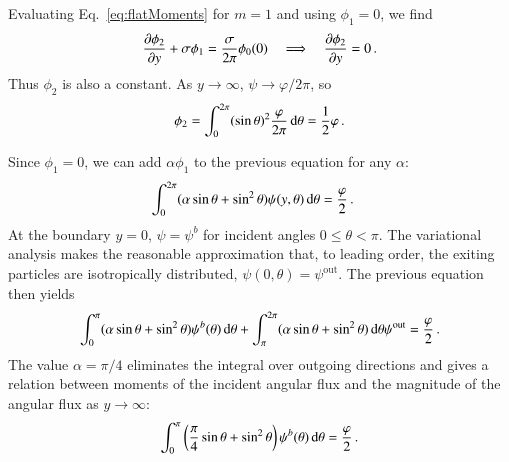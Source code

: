 \documentclass{anstrans}
\begin{document}
Evaluating Eq.~\eqref{eq:flatMoments} for $m=1$ and using
$\phi_{1}=0$, we find
\begin{equation*}
  \frac{\partial \phi_{2}}{\partial y}
  + \sigma \phi_{1}
  = \frac{\sigma}{2\pi} \phi_{0} (0)
  \quad \Longrightarrow \quad
  \frac{\partial \phi_{2}}{\partial y} = 0\,.
\end{equation*}
Thus $\phi_{2}$ is also a constant. As $y\to\infty$, $\psi\to\varphi/2\pi$, so
\begin{equation*}
  \phi_{2} = \int_{0}^{2\pi} (\sin\theta)^2 \frac{\varphi}{2\pi} \mathop{}\!\mathrm{d}\theta
  = \frac{1}{2} \varphi\,.
\end{equation*}

Since $\phi_1=0$, we can add $\alpha \phi_1$ to the previous equation for any
$\alpha$:
\begin{align*}
 \int_{0}^{2\pi} (\alpha \sin\theta + \sin^2\theta)
 \psi(y,\theta) \mathop{}\!\mathrm{d}\theta
 &= \frac{\varphi}{2}\,.
\end{align*}
At the boundary $y=0$, $\psi=\psi^b$ for incident angles $0 \le \theta < \pi$.
The
variational analysis makes the reasonable approximation that, to leading order,
the exiting particles are isotropically distributed,
$\psi(0,\theta)=\psi^\text{out}$.
The previous equation then yields
\begin{equation*}
 \int_{0}^{\pi} (\alpha \sin\theta + \sin^2\theta)
 \psi^b(\theta) \mathop{}\!\mathrm{d}\theta
 + \int_{\pi}^{2\pi} (\alpha \sin\theta + \sin^2\theta)\mathop{}\!\mathrm{d}\theta \psi^\text{out}
 = \frac{\varphi}{2}\,.
\end{equation*}
The value $\alpha=\pi/4$ eliminates the integral over outgoing directions and
gives a relation between moments of the incident angular flux and the
magnitude of the angular flux as $y\to\infty$:
\begin{equation}\label{eq:varBoundary}
  \int_{0}^{\pi} \left( \frac{\pi}{4} \sin\theta + \sin^2\theta \right)
 \psi^b(\theta) \mathop{}\!\mathrm{d}\theta
 = \frac{\varphi}{2}\,.
\end{equation}
\end{document}
